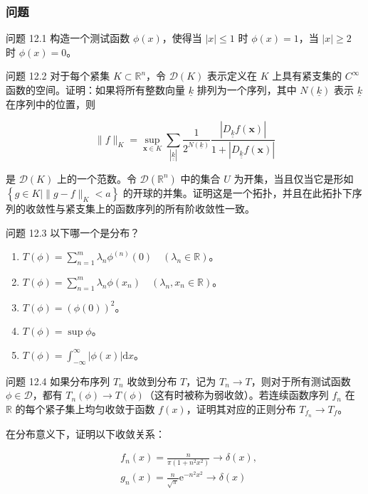 \subsubsection{问题}\label{ux95eeux9898}

问题 12.1 构造一个测试函数 \(\phi(x)\)，使得当 \(|x| \leq 1\) 时
\(\phi(x) = 1\)，当 \(|x| \geq 2\) 时 \(\phi(x) = 0\)。

问题 12.2 对于每个紧集 \(K \subset \mathbb{R}^n\)，令 \(\mathcal{D}(K)\)
表示定义在 \(K\) 上具有紧支集的 \(C^{\infty}\)
函数的空间。证明：如果将所有整数向量 \(\underline{k}\)
排列为一个序列，其中 \(N(\underline{k})\) 表示 \(\underline{k}\)
在序列中的位置，则

\[
\|f\|_{K}=\sup _{\mathbf{x} \in K} \sum_{|\underline{\underline{k}}|} \frac{1}{2^{N(\underline{k})}} \frac{\left|D_{\underline{\underline{k}}} f(\mathbf{x})\right|}{1+\left|D_{\underline{\underline{k}}} f(\mathbf{x})\right|}
\]

是 \(\mathcal{D}(K)\) 上的一个范数。令 \(\mathcal{D}(\mathbb{R}^n)\)
中的集合 \(U\) 为开集，当且仅当它是形如
\(\left\{g \in K \mid\|g-f\|_{K}<a\right\}\)
的开球的并集。证明这是一个拓扑，并且在此拓扑下序列的收敛性与紧支集上的函数序列的所有阶收敛性一致。

问题 12.3 以下哪一个是分布？

\begin{enumerate}
\def\labelenumi{(\alph{enumi})}
\item
  \(T(\phi)=\sum_{n=1}^{m} \lambda_{n} \phi^{(n)}(0) \quad\left(\lambda_{n} \in \mathbb{R}\right)\)。
\item
  \(T(\phi)=\sum_{n=1}^{m} \lambda_{n} \phi\left(x_{n}\right) \quad\left(\lambda_{n}, x_{n} \in \mathbb{R}\right)\)。
\item
  \(T(\phi)=(\phi(0))^{2}\)。
\item
  \(T(\phi)=\sup \phi\)。
\item
  \(T(\phi)=\int_{-\infty}^{\infty}|\phi(x)| \mathrm{d} x\)。
\end{enumerate}

问题 12.4 如果分布序列 \(T_{n}\) 收敛到分布 \(T\)，记为
\(T_{n} \rightarrow T\)，则对于所有测试函数
\(\phi \in \mathcal{D}\)，都有
\(T_{n}(\phi) \rightarrow T(\phi)\)（这有时被称为弱收敛）。若连续函数序列
\(f_n\) 在 \(\mathbb{R}\) 的每个紧子集上均匀收敛于函数
\(f(x)\)，证明其对应的正则分布 \(T_{f_n} \rightarrow T_{f}\)。

在分布意义下，证明以下收敛关系：

\[
\begin{aligned}
& f_{n}(x)=\frac{n}{\pi\left(1+n^{2} x^{2}\right)} \rightarrow \delta(x), \\
& g_{n}(x)=\frac{n}{\sqrt{\pi}} \mathrm{e}^{-n^{2} x^{2}} \rightarrow \delta(x)
\end{aligned}
\]

